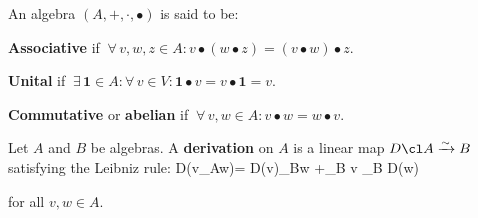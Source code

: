 An algebra $(A,+,\cdot,\bullet)$ is said to be:
\ben[label=\roman*)]
\item \textbf{Associative} if $\ \forall \, v,w,z\in A : v\bullet (w\bullet z) = (v\bullet w)\bullet z$.
\item \textbf{Unital} if $\ \exists \, \mathbf{1} \in A : \forall \, v \in V : \mathbf{1}\bullet v = v \bullet \mathbf{1} = v$.
\item \textbf{Commutative} or \textbf{abelian} if $\ \forall \, v,w\in A : v\bullet w = w\bullet v$.
\een
\ed

\bd [Derivation]
Let $A$ and $B$ be algebras. A \textbf{derivation} on $A$ is a linear map $D\cl A \xrightarrow{\sim}B$ satisfying the
Leibniz rule:
\bse
D(v\bullet_Aw)= D(v)\bullet_Bw +_B v \bullet_B D(w)
\ese

for all $v,w \in A$.
\ed
